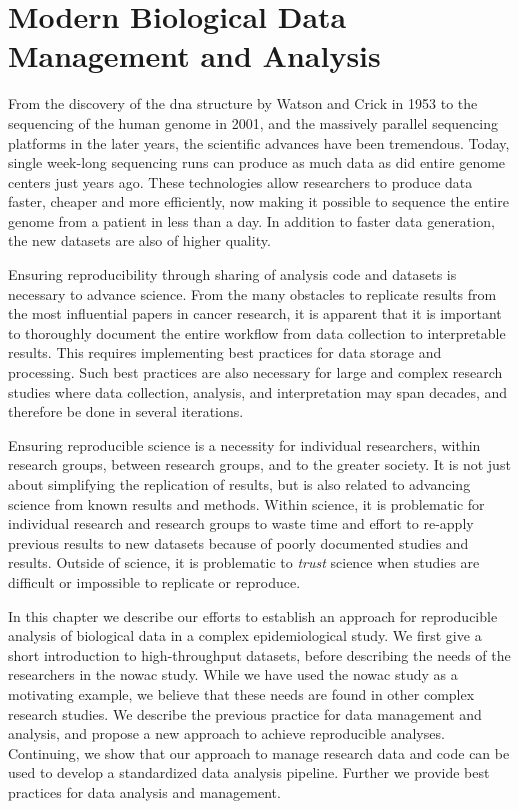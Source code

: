 \chapter{Modern Biological Data Management and Analysis}\label{biodata}
From the discovery of the \gls{dna} structure by Watson and Crick in
1953\cite{watson1953molecular} to the sequencing of the human genome in
2001,\cite{venter2001sequence,international2001initial} and the massively
parallel sequencing platforms in the later years\cite{metzker2010sequencing},
the scientific advances have been tremendous. Today, single week-long sequencing
runs can produce as much data as did entire genome centers just years
ago.\cite{kahn2011future}  These technologies allow researchers to produce data
faster, cheaper and more efficiently, now making it possible to sequence the
entire genome from a patient in less than a day. In addition to faster
data generation, the new datasets are also of higher quality.

Ensuring reproducibility through sharing of analysis code and datasets is
necessary to advance science.\cite{baker2016scientists} From the many obstacles
to replicate results from the most influential papers in cancer
research\cite{reprod}, it is apparent that it is important to thoroughly
document the entire workflow from data collection to interpretable results.
This requires implementing best practices for data storage and processing. Such
best practices are also necessary for large and complex research studies where
data collection, analysis, and interpretation may span decades, and therefore be
done in several iterations. 

Ensuring reproducible science is a necessity for individual researchers, within
research groups, between research groups, and to the greater society. It is not
just about simplifying the replication of results, but is also related to
advancing science from known results and methods. Within science, it is
problematic for individual research and research groups to waste time and effort
to re-apply previous results to new datasets because of poorly documented
studies and results. Outside of science, it is problematic to \emph{trust}
science when studies are difficult or impossible to replicate or reproduce. 

In this chapter we describe our efforts to establish an approach for
reproducible analysis of biological data in a complex epidemiological study. We
first give a short introduction to high-throughput datasets, before describing
the needs of the researchers in the \gls{nowac} study. While we have used the
\gls{nowac} study as a motivating example, we believe that these needs are found
in other complex research studies.  We describe the previous practice for data
management and analysis, and propose a new approach to achieve reproducible
analyses. Continuing, we show that our approach to manage research data and code
can be used to develop a standardized data analysis pipeline. Further we provide
best practices for data analysis and management. 

